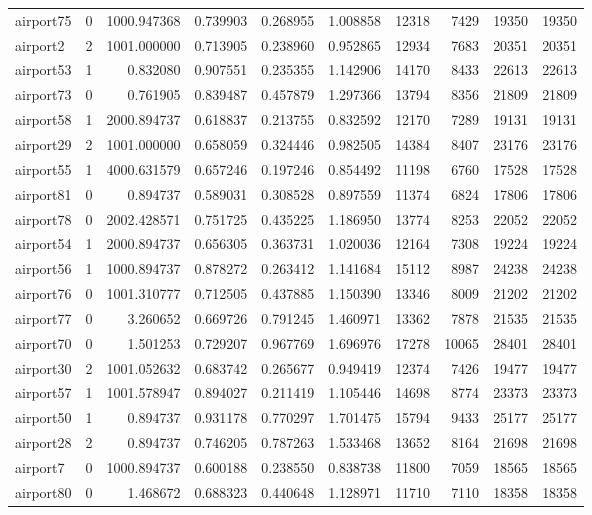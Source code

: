 \begin{longtable}{|l|r|r|r|r|r|r|r|r|r|}
airport75 & 0 & 1000.947368 & 0.739903 & 0.268955 & 1.008858 & 12318 & 7429 & 19350 & 19350 \\
airport2 & 2 & 1001.000000 & 0.713905 & 0.238960 & 0.952865 & 12934 & 7683 & 20351 & 20351 \\
airport53 & 1 & 0.832080 & 0.907551 & 0.235355 & 1.142906 & 14170 & 8433 & 22613 & 22613 \\
airport73 & 0 & 0.761905 & 0.839487 & 0.457879 & 1.297366 & 13794 & 8356 & 21809 & 21809 \\
airport58 & 1 & 2000.894737 & 0.618837 & 0.213755 & 0.832592 & 12170 & 7289 & 19131 & 19131 \\
airport29 & 2 & 1001.000000 & 0.658059 & 0.324446 & 0.982505 & 14384 & 8407 & 23176 & 23176 \\
airport55 & 1 & 4000.631579 & 0.657246 & 0.197246 & 0.854492 & 11198 & 6760 & 17528 & 17528 \\
airport81 & 0 & 0.894737 & 0.589031 & 0.308528 & 0.897559 & 11374 & 6824 & 17806 & 17806 \\
airport78 & 0 & 2002.428571 & 0.751725 & 0.435225 & 1.186950 & 13774 & 8253 & 22052 & 22052 \\
airport54 & 1 & 2000.894737 & 0.656305 & 0.363731 & 1.020036 & 12164 & 7308 & 19224 & 19224 \\
airport56 & 1 & 1000.894737 & 0.878272 & 0.263412 & 1.141684 & 15112 & 8987 & 24238 & 24238 \\
airport76 & 0 & 1001.310777 & 0.712505 & 0.437885 & 1.150390 & 13346 & 8009 & 21202 & 21202 \\
airport77 & 0 & 3.260652 & 0.669726 & 0.791245 & 1.460971 & 13362 & 7878 & 21535 & 21535 \\
airport70 & 0 & 1.501253 & 0.729207 & 0.967769 & 1.696976 & 17278 & 10065 & 28401 & 28401 \\
airport30 & 2 & 1001.052632 & 0.683742 & 0.265677 & 0.949419 & 12374 & 7426 & 19477 & 19477 \\
airport57 & 1 & 1001.578947 & 0.894027 & 0.211419 & 1.105446 & 14698 & 8774 & 23373 & 23373 \\
airport50 & 1 & 0.894737 & 0.931178 & 0.770297 & 1.701475 & 15794 & 9433 & 25177 & 25177 \\
airport28 & 2 & 0.894737 & 0.746205 & 0.787263 & 1.533468 & 13652 & 8164 & 21698 & 21698 \\
airport7 & 0 & 1000.894737 & 0.600188 & 0.238550 & 0.838738 & 11800 & 7059 & 18565 & 18565 \\
airport80 & 0 & 1.468672 & 0.688323 & 0.440648 & 1.128971 & 11710 & 7110 & 18358 & 18358 \\

\end{longtable}
